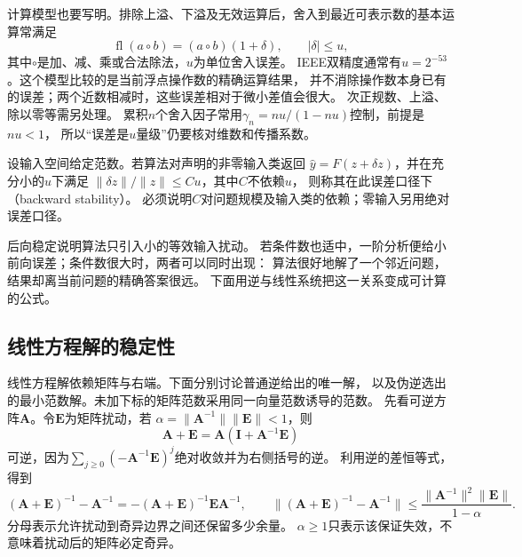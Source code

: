 计算模型也要写明。排除上溢、下溢及无效运算后，舍入到最近可表示数的基本运算常满足
\begin{equation}
 \operatorname{fl}(a\mathbin\circ b)
 =(a\mathbin\circ b)(1+\delta),\qquad |\delta|\leq u,
 \label{eq:ch06-floating-point-model}
\end{equation}
其中$\circ$是加、减、乘或合法除法，$u$为单位舍入误差。
IEEE双精度通常有$u=2^{-53}$。这个模型比较的是当前浮点操作数的精确运算结果，
并不消除操作数本身已有的误差；两个近数相减时，这些误差相对于微小差值会很大。
次正规数、上溢、除以零等需另处理。
累积$n$个舍入因子常用$\gamma_n=nu/(1-nu)$控制，前提是$nu<1$，
所以“误差是$u$量级”仍要核对维数和传播系数。

\begin{definition}[范数意义下的后向稳定]
\label{def:matrix-analysis-backward-stability}
设输入空间给定范数。若算法对声明的非零输入类返回
$\widehat y=F(z+\delta z)$，并在充分小的$u$下满足
$\lVert\delta z\rVert/\lVert z\rVert\leq C u$，其中$C$不依赖$u$，
则称其在此误差口径下（backward stability）。
必须说明$C$对问题规模及输入类的依赖；零输入另用绝对误差口径。
\end{definition}
后向稳定说明算法只引入小的等效输入扰动。
若条件数也适中，一阶分析便给小前向误差；条件数很大时，两者可以同时出现：
算法很好地解了一个邻近问题，结果却离当前问题的精确答案很远。
下面用逆与线性系统把这一关系变成可计算的公式。

\subsection{线性方程解的稳定性}
\label{sec:ch06-inverse-stability}
\label{sec:matrix-analysis-error-verification}

线性方程解依赖矩阵与右端。下面分别讨论普通逆给出的唯一解，
以及伪逆选出的最小范数解。未加下标的矩阵范数采用同一向量范数诱导的范数。
先看可逆方阵$\bm A$。令$\bm E$为矩阵扰动，若
$\alpha=\lVert\bm A^{-1}\rVert\lVert\bm E\rVert<1$，则
\[
 \bm A+\bm E=\bm A(\bm I+\bm A^{-1}\bm E)
\]
可逆，因为$\sum_{j\geq0}(-\bm A^{-1}\bm E)^j$绝对收敛并为右侧括号的逆。
利用逆的差恒等式，得到
\begin{equation}
 (\bm A+\bm E)^{-1}-\bm A^{-1}
 =-(\bm A+\bm E)^{-1}\bm E\bm A^{-1},\qquad
 \lVert(\bm A+\bm E)^{-1}-\bm A^{-1}\rVert
 \leq\frac{\lVert\bm A^{-1}\rVert^2\lVert\bm E\rVert}{1-\alpha}.
 \label{eq:ch06-inverse-finite-perturbation}
\end{equation}
分母表示允许扰动到奇异边界之间还保留多少余量。
$\alpha\geq1$只表示该保证失效，不意味着扰动后的矩阵必定奇异。


